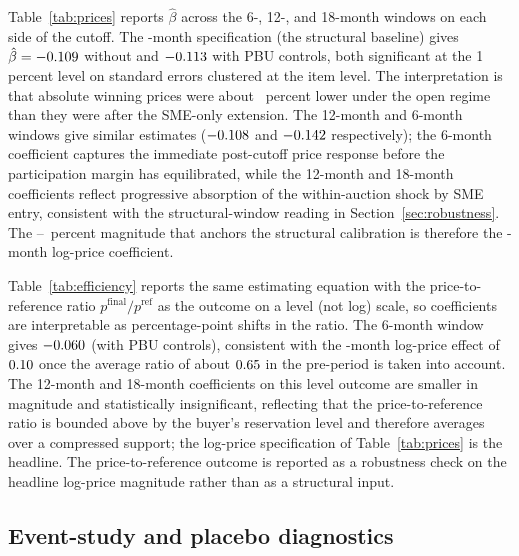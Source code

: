 



Table~\ref{tab:prices} reports $\hat\beta$ across the 6-, 12-, and 18-month windows on each side of the cutoff. The \structuralWindowM-month specification (the structural baseline) gives $\hat\beta = -0.109$ without and $-0.113$ with PBU controls, both significant at the 1 percent level on standard errors clustered at the item level. The interpretation is that absolute winning prices were about \didUpperPct~percent lower under the open regime than they were after the SME-only extension. The 12-month and 6-month windows give similar estimates ($-0.108$ and $-0.142$ respectively); the 6-month coefficient captures the immediate post-cutoff price response before the participation margin has equilibrated, while the 12-month and 18-month coefficients reflect progressive absorption of the within-auction shock by SME entry, consistent with the structural-window reading in Section~\ref{sec:robustness}. The \didLowerPct--\didUpperPct~percent magnitude that anchors the structural calibration is therefore the \structuralWindowM-month log-price coefficient.



Table~\ref{tab:efficiency} reports the same estimating equation with the price-to-reference ratio $p^{\mathrm{final}} / p^{\mathrm{ref}}$ as the outcome on a level (not log) scale, so coefficients are interpretable as percentage-point shifts in the ratio. The 6-month window gives $-0.060$ (with PBU controls), consistent with the \structuralWindowM-month log-price effect of $0.10$ once the average ratio of about $0.65$ in the pre-period is taken into account. The 12-month and 18-month coefficients on this level outcome are smaller in magnitude and statistically insignificant, reflecting that the price-to-reference ratio is bounded above by the buyer's reservation level and therefore averages over a compressed support; the log-price specification of Table~\ref{tab:prices} is the headline. The price-to-reference outcome is reported as a robustness check on the headline log-price magnitude rather than as a structural input.

\subsection{Event-study and placebo diagnostics}\label{sec:placebo_diag}


